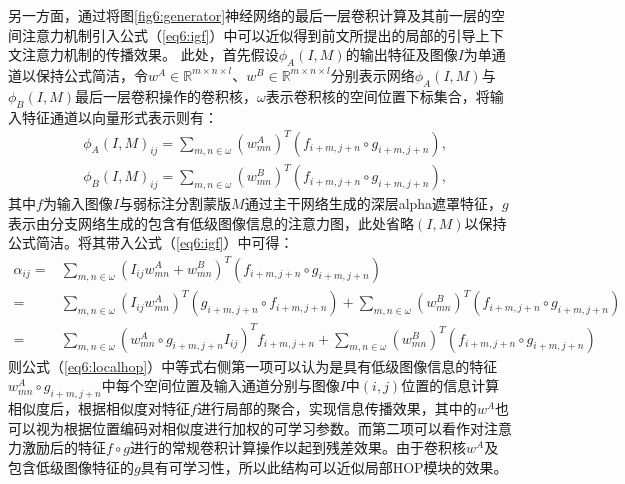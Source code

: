 另一方面，通过将图\ref{fig6:generator}神经网络的最后一层卷积计算及其前一层的空间注意力机制引入公式（\ref{eq6:igf}）中可以近似得到前文所提出的局部的引导上下文注意力机制的传播效果。
此处，首先假设$ \phi_{A}(I, M) $的输出特征及图像$I$为单通道以保持公式简洁，令$w^A\in \mathbb{R}^{m\times n\times l}$、$w^B\in \mathbb{R}^{m\times n\times l}$分别表示网络$ \phi_{A}(I, M) $与$ \phi_{B}(I, M) $最后一层卷积操作的卷积核，$\omega$表示卷积核的空间位置下标集合，将输入特征通道以向量形式表示则有：
\begin{equation}
	\begin{aligned}
	&\phi_{A}(I, M)_{ij} = \sum_{m,n\in \omega} (w^A_{mn})^T(f_{i+m,j+n}\circ g_{i+m,j+n}), \\&\phi_{B}(I, M)_{ij} = \sum_{m,n\in \omega} (w^B_{mn})^T(f_{i+m,j+n}\circ g_{i+m,j+n}),
	\end{aligned}
\end{equation}
其中$f$为输入图像$I$与弱标注分割蒙版$M$通过主干网络生成的深层alpha遮罩特征，$g$表示由分支网络生成的包含有低级图像信息的注意力图，此处省略$(I,M)$以保持公式简洁。将其带入公式（\ref{eq6:igf}）中可得：
\begin{equation}
	\begin{aligned}
	\alpha_{ij} =& \sum_{m,n\in \omega} (I_{ij}w^A_{mn}+w^B_{mn})^T(f_{i+m,j+n}\circ g_{i+m,j+n})\\
	=& \sum_{m,n\in \omega} (I_{ij}w^A_{mn})^T(g_{i+m,j+n}\circ f_{i+m,j+n}) + \sum_{m,n\in \omega} (w^B_{mn})^T(f_{i+m,j+n}\circ g_{i+m,j+n})\\
	=& \sum_{m,n\in \omega} (w^A_{mn}\circ g_{i+m,j+n}I_{ij})^Tf_{i+m,j+n} + \sum_{m,n\in \omega} (w^B_{mn})^T(f_{i+m,j+n}\circ g_{i+m,j+n})
	\end{aligned}
	\label{eq6:localhop}
\end{equation}
则公式（\ref{eq6:localhop}）中等式右侧第一项可以认为是具有低级图像信息的特征$w^A_{mn}\circ g_{i+m,j+n}$中每个空间位置及输入通道分别与图像$I$中$(i,j)$位置的信息计算相似度后，根据相似度对特征$f$进行局部的聚合，实现信息传播效果，其中的$w^A$也可以视为根据位置编码对相似度进行加权的可学习参数。而第二项可以看作对注意力激励后的特征$f\circ g$进行的常规卷积计算操作以起到残差效果。由于卷积核$w^A$及包含低级图像特征的$g$具有可学习性，所以此结构可以近似局部HOP模块的效果。

